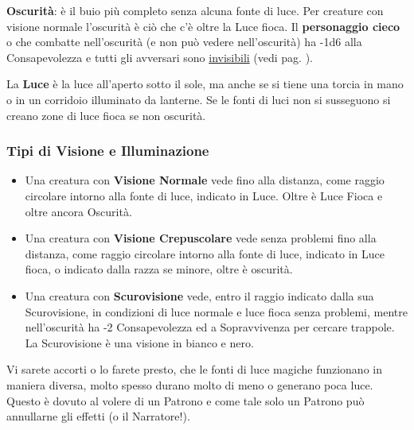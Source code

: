 \begin{multicols}{2}
\textbf{Oscurità}: è il buio più completo senza alcuna fonte di luce. Per creature con visione normale l'oscurità è ciò che c'è oltre la Luce fioca.
Il \textbf{personaggio cieco} o che combatte nell'oscurità (e non può vedere nell'oscurità) ha -1d6 alla Consapevolezza e tutti gli avversari sono \hyperlink{invisibilita}{invisibili} (vedi pag. \pageref{invisibilita}).

\medskip

La \textbf{Luce} è la luce all'aperto sotto il sole, ma anche se si tiene una torcia in mano o in un corridoio illuminato da lanterne. Se le fonti di luci non si susseguono si creano zone di luce fioca se non oscurità.

\subsubsection{Tipi di Visione e Illuminazione}

\begin{itemize}[leftmargin=*] \setlength{\itemsep}{0pt}
\item
Una creatura con \textbf{Visione Normale} vede fino alla distanza, come raggio circolare intorno alla fonte di luce, indicato in Luce. Oltre è Luce Fioca e oltre ancora Oscurità.

\item
Una creatura con \textbf{Visione Crepuscolare} vede senza problemi fino alla distanza, come raggio circolare intorno alla fonte di luce, indicato in Luce fioca, o indicato dalla razza se minore, oltre è oscurità.

\item
Una creatura con \textbf{Scurovisione}  vede, entro il raggio indicato dalla sua Scurovisione, in condizioni di luce normale e luce fioca senza problemi, mentre nell'oscurità ha -2 Consapevolezza ed a Sopravvivenza per cercare trappole. La Scurovisione è una visione in bianco e nero.
\end{itemize}

\begin{giocatore}
Vi sarete accorti o lo farete presto, che le fonti di luce magiche funzionano in maniera diversa, molto spesso durano molto di meno o generano poca luce. Questo è dovuto al volere di un Patrono e come tale solo un Patrono può annullarne gli effetti (o il Narratore!).
\end{giocatore}


\end{multicols}
